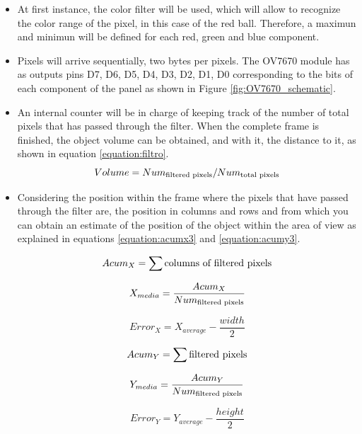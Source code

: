 \begin{itemize}
	\item At first instance, the color filter will be used, which will allow to recognize the color range of the pixel, in this case of the red ball. Therefore, a maximun and minimun will be defined for each red, green and blue component.
	\item Pixels will arrive sequentially, two bytes per pixels. The OV7670 module has as outputs pins D7, D6, D5, D4, D3, D2, D1, D0 corresponding to the bits of each component of the panel as shown in Figure \ref{fig:OV7670_schematic}.
	\item An internal counter will be in charge of keeping track of the number of total pixels that has passed through the filter. When the complete frame is finished, the object volume can be obtained, and with it, the distance to it, as shown in equation \ref{equation:filtro}.
	\begin{equation} \label{equation:filtro}
		Volume = Num_{\textup{filtered pixels}}/Num_{\textup{total pixels}}
	\end{equation}
	\item Considering the position within the frame where the pixels that have passed through the filter are, the position in columns and rows and from which you can obtain an estimate of the position of the object within the area of view as explained in equations \ref{equation:acumx3} and \ref{equation:acumy3}.
	
	\begin{equation}\label{equation:acumx}
		Acum_{X} = \sum\textup{columns of filtered pixels}
	\end{equation}
	
	\begin{equation}\label{equation:acumx2}
		X_{media} = \frac{Acum_{X}}{Num_{\textup{filtered pixels}}}
	\end{equation}

	\begin{equation}\label{equation:acumx3}
		Error_{X} = X_{average}- \frac{width}{2}
	\end{equation}
	
	\begin{equation}\label{equation:acumy}
		Acum_{Y} = \sum\textup{filtered pixels}
 	\end{equation}
	
	\begin{equation}\label{equation:acumy2}
		Y_{media} = \frac{Acum_{Y}}{Num_{\textup{filtered pixels}}}
	\end{equation}
	
	\begin{equation}\label{equation:acumy3}
		Error_{Y} = Y_{average}- \frac{height}{2}
	\end{equation}
	
	\end{itemize}

